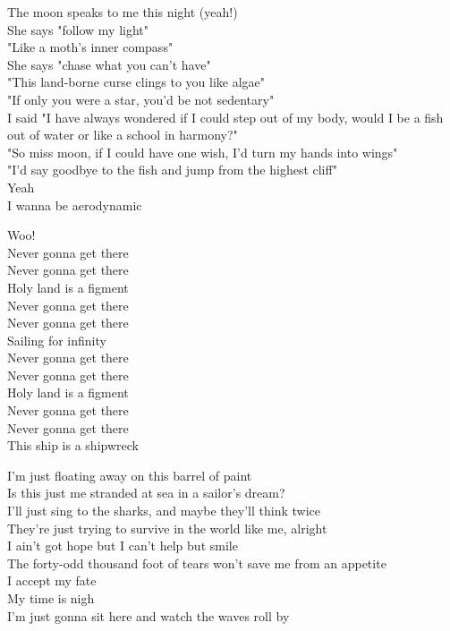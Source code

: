 
The moon speaks to me this night (yeah!)\\
She says "follow my light"\\
"Like a moth's inner compass"\\
She says "chase what you can't have"\\
"This land-borne curse clings to you like algae"\\
"If only you were a star, you'd be not sedentary"\\
I said "I have always wondered if I could step out of my body, would I be a fish out of water or like a school in harmony?"\\
"So miss moon, if I could have one wish, I'd turn my hands into wings"\\
"I'd say goodbye to the fish and jump from the highest cliff"\\

Yeah\\
I wanna be aerodynamic\\


Woo!\\
Never gonna get there\\
Never gonna get there\\
Holy land is a figment\\
Never gonna get there\\
Never gonna get there\\
Sailing for infinity\\
Never gonna get there\\
Never gonna get there\\
Holy land is a figment\\
Never gonna get there\\
Never gonna get there\\
This ship is a shipwreck\\


I'm just floating away on this barrel of paint\\
Is this just me stranded at sea in a sailor's dream?\\
I'll just sing to the sharks, and maybe they'll think twice\\
They're just trying to survive in the world like me, alright\\
I ain't got hope but I can't help but smile\\
The forty-odd thousand foot of tears won't save me from an appetite\\
I accept my fate\\
My time is nigh\\
I'm just gonna sit here and watch the waves roll by\\

